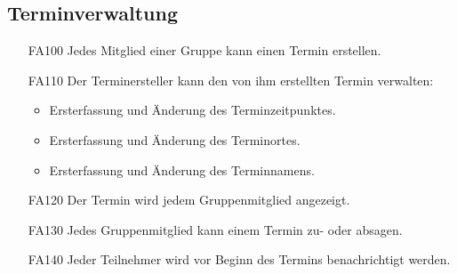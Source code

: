 \documentclass{scrartcl}
\begin{document}
		\subsection{Terminverwaltung}
		\begin{itemize}
		\item[FA100] Jedes Mitglied einer Gruppe kann einen Termin erstellen.
		\item[FA110] Der Terminersteller kann den von ihm erstellten Termin verwalten:
			\begin{itemize}
			\item Ersterfassung und Änderung des Terminzeitpunktes.
			\end{itemize}
			\begin{itemize}
			\item Ersterfassung und Änderung des Terminortes.
			\end{itemize}
			\begin{itemize}
			\item Ersterfassung und Änderung des Terminnamens.
			\end{itemize}
			
		\item[FA120] Der Termin wird jedem Gruppenmitglied angezeigt.
		\item[FA130] Jedes Gruppenmitglied kann einem Termin zu- oder absagen.
		\item[FA140] Jeder Teilnehmer wird vor Beginn des Termins benachrichtigt werden.
		
		\end{itemize}
		
		
		
		
	\newpage
\end{document}
